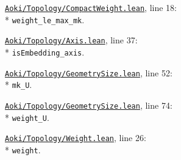 \begin{leansources}
\item \href{../../../lean/Aoki/Topology/CompactWeight.lean}{\nolinkurl{Aoki/Topology/CompactWeight.lean}}, line 18:\\*
\nolinkurl{weight_le_max_mk}.
\item \href{../../../lean/Aoki/Topology/Axis.lean}{\nolinkurl{Aoki/Topology/Axis.lean}}, line 37:\\*
\nolinkurl{isEmbedding_axis}.
\item \href{../../../lean/Aoki/Topology/GeometrySize.lean}{\nolinkurl{Aoki/Topology/GeometrySize.lean}}, line 52:\\*
\nolinkurl{mk_U}.
\item \href{../../../lean/Aoki/Topology/GeometrySize.lean}{\nolinkurl{Aoki/Topology/GeometrySize.lean}}, line 74:\\*
\nolinkurl{weight_U}.
\item \href{../../../lean/Aoki/Topology/Weight.lean}{\nolinkurl{Aoki/Topology/Weight.lean}}, line 26:\\*
\nolinkurl{weight}.
\end{leansources}

